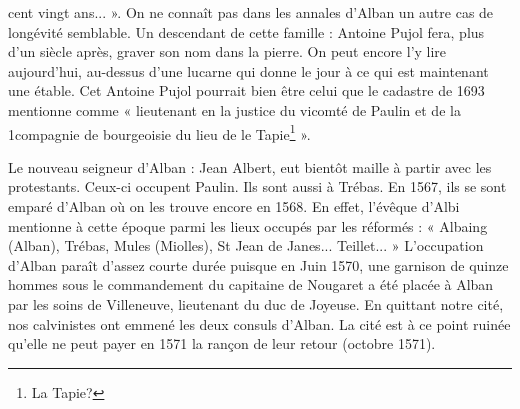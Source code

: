 cent vingt ans... ». On ne connaît pas dans les annales d'Alban un autre
cas de longévité semblable. Un descendant de cette famille :
Antoine Pujol fera, plus d'un siècle après, graver son nom dans la
pierre. On peut encore l'y lire aujourd'hui, au-dessus d'une lucarne
qui donne le jour à ce qui est maintenant une étable. Cet Antoine
Pujol pourrait bien être celui que le cadastre de 1693 mentionne
comme « lieutenant en la justice du vicomté de Paulin et de la
1\iere compagnie de bourgeoisie du lieu de le Tapie\footnote{La Tapie?} ».

Le nouveau seigneur d'Alban : Jean Albert, eut bientôt maille à
partir avec les protestants. Ceux-ci occupent Paulin. Ils sont aussi
à Trébas. En 1567, ils se sont emparé d'Alban où on les trouve
encore en 1568. En effet, l'évêque d'Albi mentionne à cette époque
parmi les lieux occupés par les réformés : « Albaing (Alban),
Trébas, Mules (Miolles), St Jean de Janes... Teillet... »
L'occupation d'Alban paraît d'assez courte durée puisque en Juin
1570, une garnison de quinze hommes sous le commandement du
capitaine de Nougaret a été placée à Alban par les soins de
Villeneuve, lieutenant du duc de Joyeuse. En quittant notre cité,
nos calvinistes ont emmené les deux consuls d'Alban. La cité est
à ce point ruinée qu'elle ne peut payer en 1571 la rançon de leur
retour (octobre 1571).
